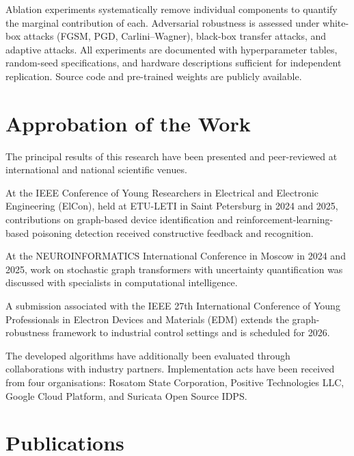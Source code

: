 Ablation experiments systematically remove individual components to quantify the marginal contribution of each. Adversarial robustness is assessed under white-box attacks (FGSM, PGD, Carlini--Wagner), black-box transfer attacks, and adaptive attacks. All experiments are documented with hyperparameter tables, random-seed specifications, and hardware descriptions sufficient for independent replication. Source code and pre-trained weights are publicly available.


\section*{Approbation of the Work}

The principal results of this research have been presented and peer-reviewed at international and national scientific venues.

At the IEEE Conference of Young Researchers in Electrical and Electronic Engineering (ElCon), held at ETU-LETI in Saint Petersburg in 2024 and 2025, contributions on graph-based device identification and reinforcement-learning-based poisoning detection received constructive feedback and recognition.

At the NEUROINFORMATICS International Conference in Moscow in 2024 and 2025, work on stochastic graph transformers with uncertainty quantification was discussed with specialists in computational intelligence.

A submission associated with the IEEE 27th International Conference of Young Professionals in Electron Devices and Materials (EDM) extends the graph-robustness framework to industrial control settings and is scheduled for 2026.

The developed algorithms have additionally been evaluated through collaborations with industry partners. Implementation acts have been received from four organisations: Rosatom State Corporation, Positive Technologies LLC, Google Cloud Platform, and Suricata Open Source IDPS.


\section*{Publications}

